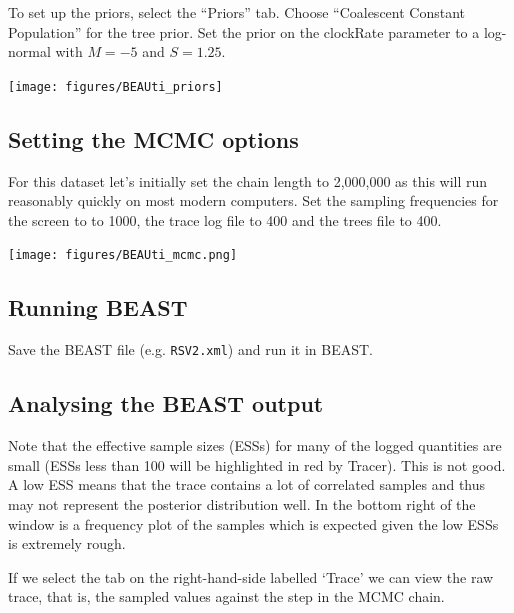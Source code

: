 \documentclass[12pt]{article}
\begin{document}
To set up the priors, select the ``Priors'' tab.
Choose ``Coalescent Constant Population'' for the tree prior. Set the prior on the clockRate parameter to a log-normal with $M=-5$ and $S=1.25$. 

\medskip{}

\begin{center}
\texttt{[image: figures/BEAUti\_priors]}%
\end{center}

\medskip{}

\subsection{Setting the MCMC options}

For this dataset let's initially set the chain length to 2,000,000 as this will run 
reasonably quickly on most modern computers. Set the sampling frequencies for the screen to
to 1000, the trace log file to 400 and the trees file to 400.

\begin{center}
\texttt{[image: figures/BEAUti\_mcmc.png]}%
\end{center}


\subsection*{Running BEAST}

Save the BEAST file (e.g. \texttt{RSV2.xml}) and run it in BEAST.

\subsection*{Analysing the BEAST output}

Note that the effective sample sizes (ESSs) for many of the logged quantities are small (ESSs less than 100 will be highlighted in red by Tracer).
This is not good. A low ESS means that the trace contains a lot of correlated samples and thus may not represent the
posterior distribution well. In the bottom right of the window is a frequency plot of the samples which is expected given the
low ESSs is extremely rough.

If we select the tab on the right-hand-side labelled `Trace' we can view the raw trace, that is, the sampled values against the step in the MCMC chain.

\medskip{}
\end{document}

